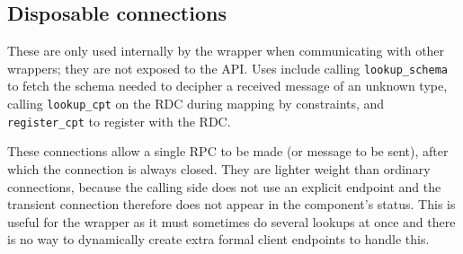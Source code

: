 \documentclass[12pt,a4paper,twoside]{article}
\renewcommand{\_}{\texttt{\symbol{95}}}
\begin{document}
%
%
%
%
%
%
%
%
%

\subsection{Disposable connections}

These are only used internally by the wrapper when communicating
with other wrappers; they are not exposed to the API. Uses include
calling \verb^lookup_schema^ to fetch the schema needed to decipher
a received message of an unknown type, calling \verb^lookup_cpt^
on the RDC during mapping by constraints, and \verb^register_cpt^
to register with the RDC.

These connections allow a single RPC to be made (or message to be
sent), after which the connection is always closed. They are
lighter weight than ordinary connections, because the calling side
does not use an explicit endpoint and the transient connection therefore
does not appear in the component's status. This is useful for the
wrapper as it must sometimes do several lookups at once and there is
no way to dynamically create extra formal client endpoints to handle this.
\end{document}
